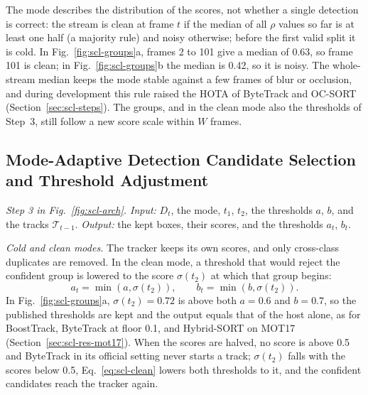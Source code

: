 The mode describes the distribution of the scores, not whether a single detection is correct: the stream is clean at frame $t$ if the median of all $\rho$ values so far is at least one half (a majority rule) and noisy otherwise; before the first valid split it is cold. In Fig.~\ref{fig:scl-groups}a, frames 2 to 101 give a median of 0.63, so frame 101 is clean; in Fig.~\ref{fig:scl-groups}b the median is 0.42, so it is noisy. The whole-stream median keeps the mode stable against a few frames of blur or occlusion, and during development this rule raised the HOTA of ByteTrack and OC-SORT (Section~\ref{sec:scl-steps}). The groups, and in the clean mode also the thresholds of Step~3, still follow a new score scale within $W$ frames.

\subsection{Mode-Adaptive Detection Candidate Selection and Threshold Adjustment}\label{sec:scl-modes}
\emph{Step 3 in Fig.~\ref{fig:scl-arch}. Input:} $D_t$, the mode, $t_1$, $t_2$, the thresholds $a$, $b$, and the tracks $\mathcal{T}_{t-1}$. \emph{Output:} the kept boxes, their scores, and the thresholds $a_t$, $b_t$.

\emph{Cold and clean modes.} The tracker keeps its own scores, and only cross-class duplicates are removed. In the clean mode, a threshold that would reject the confident group is lowered to the score $\sigma(t_2)$ at which that group begins:
\begin{equation}
a_t=\min\!\left(a,\sigma(t_2)\right),\qquad b_t=\min\!\left(b,\sigma(t_2)\right).
\label{eq:scl-clean}
\end{equation}
In Fig.~\ref{fig:scl-groups}a, $\sigma(t_2)=0.72$ is above both $a=0.6$ and $b=0.7$, so the published thresholds are kept and the output equals that of the host alone, as for BoostTrack, ByteTrack at floor 0.1, and Hybrid-SORT on MOT17 (Section~\ref{sec:scl-res-mot17}). When the scores are halved, no score is above 0.5 and ByteTrack in its official setting never starts a track; $\sigma(t_2)$ falls with the scores below 0.5, Eq.~\eqref{eq:scl-clean} lowers both thresholds to it, and the confident candidates reach the tracker again.

